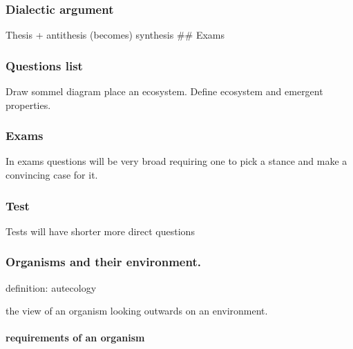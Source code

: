 \documentclass[]{article}
\let\oldparagraph\paragraph
\renewcommand{\paragraph}[1]{\oldparagraph{#1}\mbox{}}
\begin{document}
\hypertarget{dialectic-argument}{%
\subsubsection{Dialectic argument}\label{dialectic-argument}}

Thesis + antithesis (becomes) synthesis \#\# Exams

\hypertarget{questions-list}{%
\subsubsection{Questions list}\label{questions-list}}

Draw sommel diagram place an ecosystem. Define ecosystem and emergent
properties.

\hypertarget{exams}{%
\subsubsection{Exams}\label{exams}}

In exams questions will be very broad requiring one to pick a stance and
make a convincing case for it.

\hypertarget{test}{%
\subsubsection{Test}\label{test}}

Tests will have shorter more direct questions

\hypertarget{organisms-and-their-environment.}{%
\subsubsection{Organisms and their
environment.}\label{organisms-and-their-environment.}}

definition: autecology

the view of an organism looking outwards on an environment.

\hypertarget{requirements-of-an-organism}{%
\paragraph{requirements of an
organism}\label{requirements-of-an-organism}}
\end{document}
